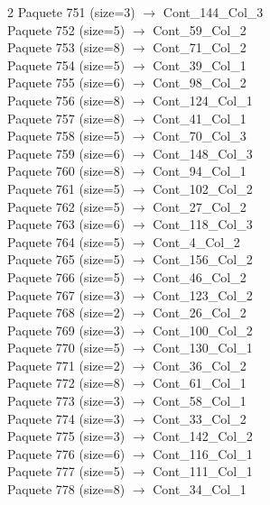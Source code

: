 \begin{multicols}{2}
Paquete 751 (size=3) $\rightarrow$ Cont\_144\_Col\_3\\
Paquete 752 (size=5) $\rightarrow$ Cont\_59\_Col\_2\\
Paquete 753 (size=8) $\rightarrow$ Cont\_71\_Col\_2\\
Paquete 754 (size=5) $\rightarrow$ Cont\_39\_Col\_1\\
Paquete 755 (size=6) $\rightarrow$ Cont\_98\_Col\_2\\
Paquete 756 (size=8) $\rightarrow$ Cont\_124\_Col\_1\\
Paquete 757 (size=8) $\rightarrow$ Cont\_41\_Col\_1\\
Paquete 758 (size=5) $\rightarrow$ Cont\_70\_Col\_3\\
Paquete 759 (size=6) $\rightarrow$ Cont\_148\_Col\_3\\
Paquete 760 (size=8) $\rightarrow$ Cont\_94\_Col\_1\\
Paquete 761 (size=5) $\rightarrow$ Cont\_102\_Col\_2\\
Paquete 762 (size=5) $\rightarrow$ Cont\_27\_Col\_2\\
Paquete 763 (size=6) $\rightarrow$ Cont\_118\_Col\_3\\
Paquete 764 (size=5) $\rightarrow$ Cont\_4\_Col\_2\\
Paquete 765 (size=5) $\rightarrow$ Cont\_156\_Col\_2\\
Paquete 766 (size=5) $\rightarrow$ Cont\_46\_Col\_2\\
Paquete 767 (size=3) $\rightarrow$ Cont\_123\_Col\_2\\
Paquete 768 (size=2) $\rightarrow$ Cont\_26\_Col\_2\\
Paquete 769 (size=3) $\rightarrow$ Cont\_100\_Col\_2\\
Paquete 770 (size=5) $\rightarrow$ Cont\_130\_Col\_1\\
Paquete 771 (size=2) $\rightarrow$ Cont\_36\_Col\_2\\
Paquete 772 (size=8) $\rightarrow$ Cont\_61\_Col\_1\\
Paquete 773 (size=3) $\rightarrow$ Cont\_58\_Col\_1\\
Paquete 774 (size=3) $\rightarrow$ Cont\_33\_Col\_2\\
Paquete 775 (size=3) $\rightarrow$ Cont\_142\_Col\_2\\
Paquete 776 (size=6) $\rightarrow$ Cont\_116\_Col\_1\\
Paquete 777 (size=5) $\rightarrow$ Cont\_111\_Col\_1\\
Paquete 778 (size=8) $\rightarrow$ Cont\_34\_Col\_1\\

\end{multicols}
